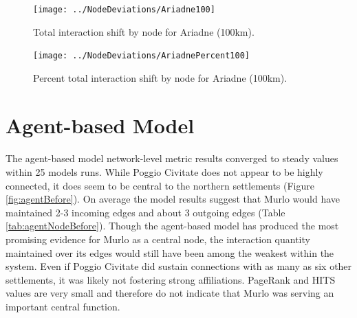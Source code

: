 \documentclass[12pt,a4paper]{thesis}
\begin{document}
\begin{figure}[H]
\centering
\texttt{[image: ../NodeDeviations/Ariadne100]}
\caption{Total interaction shift by node for Ariadne (100km).}
\label{fig:Ariadne100}
\end{figure}

\begin{figure}[H]
\centering
\texttt{[image: ../NodeDeviations/AriadnePercent100]}
\caption{Percent total interaction shift by node for Ariadne (100km).}
\label{fig:AriadnePercent100}
\end{figure}



\section{Agent-based Model}

\paragraph{}
The agent-based model network-level metric results converged to steady values within 25 models runs. While Poggio Civitate does not appear to be highly connected, it does seem to be central to the northern settlements (Figure \ref{fig:agentBefore}). On average the model results suggest that Murlo would have maintained 2-3 incoming edges and about 3 outgoing edges (Table \ref{tab:agentNodeBefore}). Though the agent-based model has produced the most promising evidence for Murlo as a central node, the interaction quantity maintained over its edges would still have been among the weakest within the system. Even if Poggio Civitate did sustain connections with as many as six other settlements, it was likely not fostering strong affiliations. PageRank and HITS values are very small and therefore do not indicate that Murlo was serving an important central function.
\end{document}
